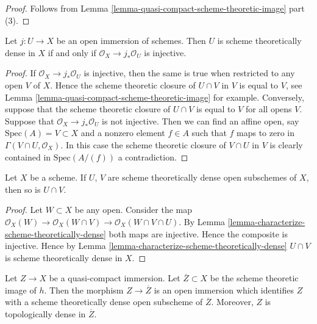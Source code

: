 \begin{proof}
Follows from Lemma \ref{lemma-quasi-compact-scheme-theoretic-image} part (3).
\end{proof}

\begin{lemma}
\label{lemma-characterize-scheme-theoretically-dense}
Let $j : U \to X$ be an open immersion of schemes.
Then $U$ is scheme theoretically dense in $X$ if and only if
$\mathcal{O}_X \to j_*\mathcal{O}_U$ is injective.
\end{lemma}

\begin{proof}
If $\mathcal{O}_X \to j_*\mathcal{O}_U$ is injective,
then the same is true when restricted to any open $V$ of $X$.
Hence the scheme theoretic closure of $U \cap V$ in $V$
is equal to $V$, see Lemma \ref{lemma-quasi-compact-scheme-theoretic-image}
for example. Conversely, suppose that the scheme theoretic
closure of $U \cap V$ is equal to $V$ for all opens $V$.
Suppose that $\mathcal{O}_X \to j_*\mathcal{O}_U$ is not injective.
Then we can find an affine open, say $\text{Spec}(A) = V \subset X$
and a nonzero element $f \in A$ such that $f$ maps to zero in
$\Gamma(V \cap U, \mathcal{O}_X)$. In this case the scheme theoretic
closure of $V \cap U$ in $V$ is clearly contained in $\text{Spec}(A/(f))$
a contradiction.
\end{proof}

\begin{lemma}
\label{lemma-intersection-scheme-theoretically-dense}
Let $X$ be a scheme. If $U$, $V$ are scheme theoretically dense
open subschemes of $X$, then so is $U \cap V$.
\end{lemma}

\begin{proof}
Let $W \subset X$ be any open.
Consider the map
$\mathcal{O}_X(W) \to \mathcal{O}_X(W \cap V)
\to \mathcal{O}_X(W \cap V \cap U)$.
By Lemma \ref{lemma-characterize-scheme-theoretically-dense}
both maps are injective. Hence the composite is injective.
Hence by Lemma \ref{lemma-characterize-scheme-theoretically-dense}
$U \cap V$ is scheme theoretically dense in $X$.
\end{proof}

\begin{lemma}
\label{lemma-quasi-compact-immersion}
Let $Z \to X$ be a quasi-compact immersion.
Let $\overline{Z} \subset X$ be the scheme theoretic image of $h$.
Then the morphism $Z \to \overline{Z}$ is an open immersion
which identifies $Z$ with a scheme theoretically dense open
subscheme of $\overline{Z}$. Moreover, $Z$ is topologically
dense in $\overline{Z}$.
\end{lemma}

